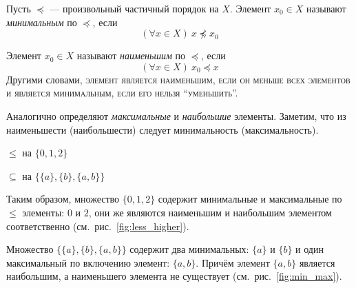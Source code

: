 Пусть $\preceq$ --- произвольный частичный порядок на $X$.
Элемент $x_0\in X$ называют {\it минимальным}
по $\preceq$, если
\[
  (\forall x\in X)~x\npreceq x_0
\]

Элемент $x_0\in X$ называют {\it наименьшим}
 по $\preceq$, если
\[
  (\forall x\in X)~x_0\preceq x
\]
Другими словами, \textsc{элемент является наименьшим,
  если он меньше всех элементов и является минимальным, если его нельзя
  ``уменьшить''.}

Аналогично определяют {\it максимальные} и {\it наибольшие} элементы.
Заметим, что из наименьшести (наибольшести) следует минимальность (максимальность).

\begin{marginfigure}
  \center

  \caption{$\leq$ на $\{0,1,2\}$}\label{fig:less_higher}
\end{marginfigure}

\begin{marginfigure}
  \center

  \caption{$\subseteq$ на $\{\{a\},\{b\},\{a,b\}\}$}\label{fig:min_max}
\end{marginfigure}

Таким образом, множество $\{0,1,2\}$ содержит минимальные и максимальные по $\leq$
элементы: $0$ и $2$, они же являются наименьшим и
наибольшим элементом соответственно (см.~рис.~\ref{fig:less_higher}).

Множество $\{\{a\},\{b\},\{a,b\}\}$ содержит
два минимальных: $\{a\}$ и $\{b\}$ и один максимальный
по включению элемент: $\{a,b\}$. Причём элемент $\{a,b\}$ является наибольшим, а
наименьшего элемента не существует (см.~рис.~\ref{fig:min_max}).

